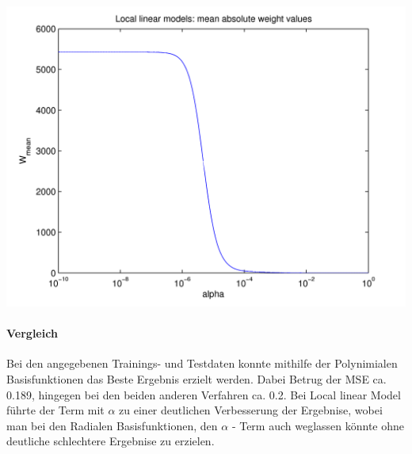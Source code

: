   \begin{center}
	\includegraphics[width=15cm]{figures/114/local_meanweight.png}
	\label{fig:local_meanweight}
  \end{center}


\paragraph{Vergleich}

Bei den angegebenen Trainings- und Testdaten konnte mithilfe der Polynimialen Basisfunktionen das Beste
Ergebnis erzielt werden. Dabei Betrug der MSE ca. 0.189, hingegen bei den beiden anderen Verfahren ca. 0.2.
Bei Local linear Model führte der Term mit $\alpha$ zu einer deutlichen Verbesserung der Ergebnise, wobei
man bei den Radialen Basisfunktionen, den $\alpha$ - Term auch weglassen könnte ohne deutliche schlechtere
Ergebnise zu erzielen.
